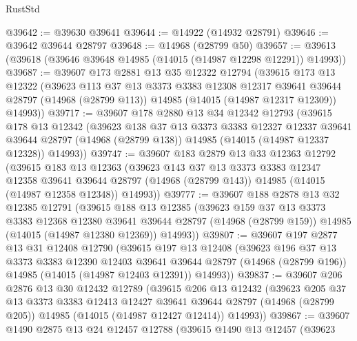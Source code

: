 \begin{lexlean}{RustStd}
\begin{coremodule}
@39642 := @39630 @39641
@39644 := @14922 (@14932 @28791)
@39646 := @39642 @39644 @28797
@39648 := @14968 (@28799 @50)
@39657 := @39613 (@39618 (@39646 @39648 @14985 (@14015 (@14987 @12298 @12291)) @14993))
@39687 := @39607
    @173
    @2881
    @13
    @35
    @12322
    @12794
    (@39615
      @173
      @13
      @12322
      (@39623
        @113
        @37
        @13
        @3373
        @3383
        @12308
        @12317
        @39641
        @39644
        @28797
        (@14968 (@28799 @113))
        @14985
        (@14015 (@14987 @12317 @12309))
        @14993))
@39717 := @39607
    @178
    @2880
    @13
    @34
    @12342
    @12793
    (@39615
      @178
      @13
      @12342
      (@39623
        @138
        @37
        @13
        @3373
        @3383
        @12327
        @12337
        @39641
        @39644
        @28797
        (@14968 (@28799 @138))
        @14985
        (@14015 (@14987 @12337 @12328))
        @14993))
@39747 := @39607
    @183
    @2879
    @13
    @33
    @12363
    @12792
    (@39615
      @183
      @13
      @12363
      (@39623
        @143
        @37
        @13
        @3373
        @3383
        @12347
        @12358
        @39641
        @39644
        @28797
        (@14968 (@28799 @143))
        @14985
        (@14015 (@14987 @12358 @12348))
        @14993))
@39777 := @39607
    @188
    @2878
    @13
    @32
    @12385
    @12791
    (@39615
      @188
      @13
      @12385
      (@39623
        @159
        @37
        @13
        @3373
        @3383
        @12368
        @12380
        @39641
        @39644
        @28797
        (@14968 (@28799 @159))
        @14985
        (@14015 (@14987 @12380 @12369))
        @14993))
@39807 := @39607
    @197
    @2877
    @13
    @31
    @12408
    @12790
    (@39615
      @197
      @13
      @12408
      (@39623
        @196
        @37
        @13
        @3373
        @3383
        @12390
        @12403
        @39641
        @39644
        @28797
        (@14968 (@28799 @196))
        @14985
        (@14015 (@14987 @12403 @12391))
        @14993))
@39837 := @39607
    @206
    @2876
    @13
    @30
    @12432
    @12789
    (@39615
      @206
      @13
      @12432
      (@39623
        @205
        @37
        @13
        @3373
        @3383
        @12413
        @12427
        @39641
        @39644
        @28797
        (@14968 (@28799 @205))
        @14985
        (@14015 (@14987 @12427 @12414))
        @14993))
@39867 := @39607
    @1490
    @2875
    @13
    @24
    @12457
    @12788
    (@39615
      @1490
      @13
      @12457
      (@39623

\end{coremodule}
\end{lexlean}
